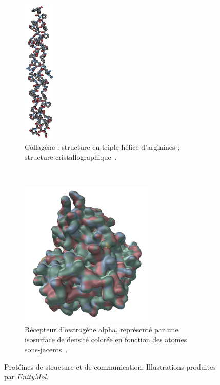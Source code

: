 	\begin{figure}[H]
		\begin{subfigure}[t]{.4\textwidth}
			\centering
			\includegraphics[height=7cm]{./figures/ch1/collagen}
			\caption[Collagène.]{Collagène : structure en triple-hélice d'arginines ; structure cristallographique~\cite{okuyama2014preferred}.}
			\label{fig:collagen}
		\end{subfigure}
		~
		\begin{subfigure}[t]{.6\textwidth}
			\centering
			\includegraphics[height=7cm]{./figures/ch1/eralpha}
			\caption[Récepteur d'œstrogène alpha.]{Récepteur d'œstrogène alpha, représenté par une isosurface de densité colorée en fonction des atomes sous-jacents~\cite{nwachukwu2016systems}.}
			\label{fig:eralpha}
		\end{subfigure}
		\caption[Protéines de structure et de communication.]{Protéines de structure et de communication. Illustrations produites par \emph{UnityMol}.}
		\label{fig:prot_misc}
	\end{figure}
	
